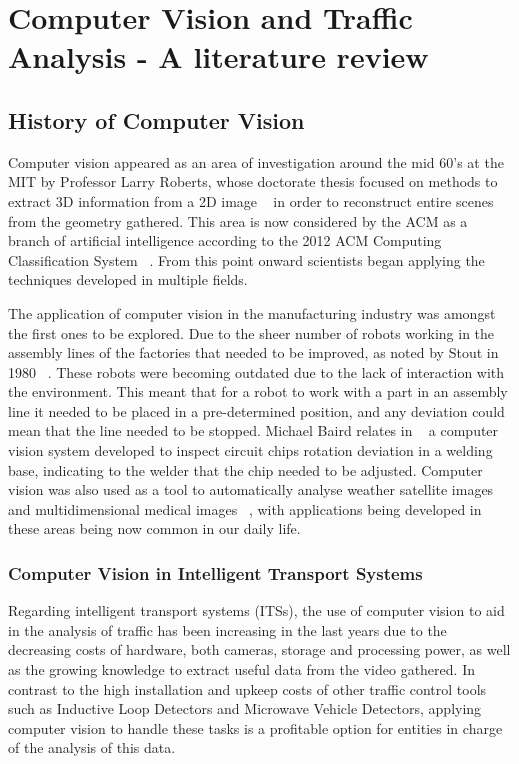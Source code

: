 
\chapter{Computer Vision and Traffic Analysis - A literature review} \label{chap:sota}

\section{History of Computer Vision}

Computer vision appeared as an area of investigation around the mid 60's at the MIT by Professor Larry Roberts, whose doctorate thesis focused on methods to extract 3D information from a 2D image ~\cite{huang_computer_1996} in order to reconstruct entire scenes from the geometry gathered. This area is now considered by the ACM as a branch of artificial intelligence according to the 2012 ACM Computing Classification System ~\cite{acm_2012_2012}. From this point onward scientists began applying the techniques developed in multiple fields.

The application of computer vision in the manufacturing industry was amongst the first ones to be explored. Due to the sheer number of robots working in the assembly lines of the factories that needed to be improved, as noted by Stout in 1980 ~\cite{stout_computer_1980}. These robots were becoming outdated due to the lack of interaction with the environment. This meant that for a robot to work with a part in an assembly line it needed to be placed in a pre-determined position, and any deviation could mean that the line needed to be stopped. Michael Baird relates in ~\cite{l._baird_sight-i:_1978} a computer vision system developed to inspect circuit chips rotation deviation in a welding base, indicating to the welder that the chip needed to be adjusted. Computer vision was also used as a tool to automatically analyse weather satellite images ~\cite{binford_computer_1973-2} and multidimensional medical images ~\cite{ayache_medical_1998}, with applications being developed in these areas being now common in our daily life.

\subsection{Computer Vision in Intelligent Transport Systems}

Regarding intelligent transport systems (ITSs), the use of computer vision to aid in the analysis of traffic has been increasing in the last years due to the decreasing costs of hardware, both cameras, storage and processing power, as well as the growing knowledge to extract useful data from the video gathered. In contrast to the high installation and upkeep costs of other traffic control tools such as Inductive Loop Detectors and Microwave Vehicle Detectors, applying computer vision to handle these tasks is a profitable option for entities in charge of the analysis of this data.

